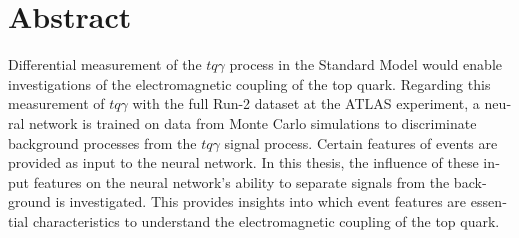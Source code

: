 \thispagestyle{plain}
\nocite{PhysRevLett.121.221802}

\section*{Abstract}
\begin{english}
Differential measurement of the $tq\gamma$ process in the Standard Model would enable investigations of the electromagnetic coupling of the top quark. 
Regarding this measurement of $tq\gamma$ with the full Run-2 dataset at the ATLAS experiment, a neural network is trained on data from Monte Carlo simulations to discriminate background processes from the $tq\gamma$ signal process. 
Certain features of events are provided as input to the neural network. 
In this thesis, the influence of these input features on the neural network's ability to separate signals from the background is investigated. This provides insights into which event features are essential characteristics to understand the electromagnetic coupling of the top quark.
\end{english}
